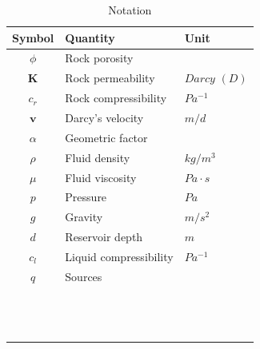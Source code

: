 \documentclass[12pt]{article}
\begin{document}
\begin{table}[!h]
\centering
\begin{tabular}{c l l }
\hline
Symbol & Quantity & Unit \\[0.5ex]
\hline
$\phi$ & Rock porosity&   \\
 $\mathbf{K}$& Rock permeability&  $Darcy$ $(D)$ \\
 $c_r$& Rock compressibility&  $Pa^{-1}$ \\
$\mathbf{v}$ & Darcy's velocity& $ m/d$ \\
 $\alpha$& Geometric factor&   \\
$\rho$ &Fluid density &  $kg/m^3$ \\
 $\mu$&Fluid viscosity & $Pa \cdot s$   \\
${p}$  &Pressure &  $Pa$ \\
$g$  &Gravity &  $m/s^2$ \\
$d$ & Reservoir depth&  $m$ \\
$c_l$ &Liquid compressibility &  $Pa^{-1}$ \\
$q$ &Sources &   \\
 & &   \\
 & &   \\
 & &   \\
 & &   \\
 & &   \\
 & &   \\
 & &   \\
 & &   \\
 & &   \\
 & &   \\
 & &   \\
 & &   \\
 & &   \\
\hline
\end{tabular}\label{table:symbols}
\caption{Notation}
\end{table}
\newpage
\end{document}

